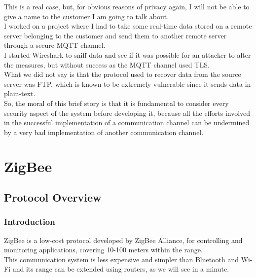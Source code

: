 \documentclass[12pt]{report}
\begin{document}
{{This is a real case, but, for obvious reasons of privacy again, I will not be able to give a name to the customer I am going to talk about.\\

I worked on a project where I had to take some real-time data stored on a remote server belonging to the customer and send them to another remote server through a secure MQTT channel.\\
I started Wireshark to sniff data and see if it was possible for an attacker to alter the measures, but without success as the MQTT channel used TLS.\\

What we did not say is that the protocol used to recover data from the source server was FTP, which is known to be extremely vulnerable since it sends data in plain-text.\\


So, the moral of this brief story is that it is fundamental to consider every security aspect of the system before developing it, because all the efforts involved in the successful implementation of a communication channel can be undermined by a very bad implementation of another communication channel.\\


\part{ZigBee}

\chapter{Protocol Overview}

\section{Introduction}
\bigskip

ZigBee is a low-cost protocol developed by ZigBee Alliance, for controlling and monitoring applications, covering 10-100 meters within the range. \\
This communication system is less expensive and simpler than Bluetooth and Wi-Fi and its range can be extended using routers, as we will see in a minute.\\

}}
\end{document}
